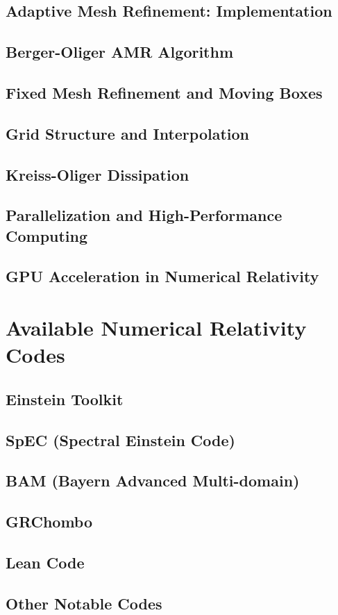 \section{Adaptive Mesh Refinement: Implementation}\label{sec:-implementation}
\section{Berger-Oliger AMR Algorithm}\label{sec:berger-oliger-amr-algorithm}
\section{Fixed Mesh Refinement and Moving Boxes}\label{sec:fixed-mesh-refinement-and-moving-boxes}
\section{Grid Structure and Interpolation}\label{sec:grid-structure-and-interpolation}
\section{Kreiss-Oliger Dissipation}\label{sec:kreiss-oliger-dissipation}
\section{Parallelization and High-Performance Computing}\label{sec:parallelization-and-high-performance-computing}
\section{GPU Acceleration in Numerical Relativity}\label{sec:gpu-acceleration-in-numerical-relativity}

\chapter{Available Numerical Relativity Codes}\label{ch:available-numerical-relativity-codes}
\section{Einstein Toolkit}\label{sec:einstein-toolkit}
\section{SpEC (Spectral Einstein Code)}\label{sec:spec-spectral-einstein-code}
\section{BAM (Bayern Advanced Multi-domain)}\label{sec:bam-bayern-advanced-multi-domain}
\section{GRChombo}\label{sec:grchombo}
\section{Lean Code}\label{sec:lean-code}
\section{Other Notable Codes}\label{sec:other-notable-codes}